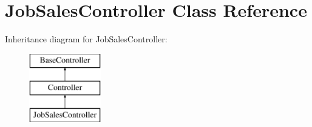 \hypertarget{class_responsive_1_1_http_1_1_controllers_1_1_job_sales_controller}{}\section{Job\+Sales\+Controller Class Reference}
\label{class_responsive_1_1_http_1_1_controllers_1_1_job_sales_controller}
Inheritance diagram for Job\+Sales\+Controller\+:\begin{figure}[H]
\begin{center}
\leavevmode
\includegraphics[height=3.000000cm]{class_responsive_1_1_http_1_1_controllers_1_1_job_sales_controller}
\end{center}
\end{figure}

